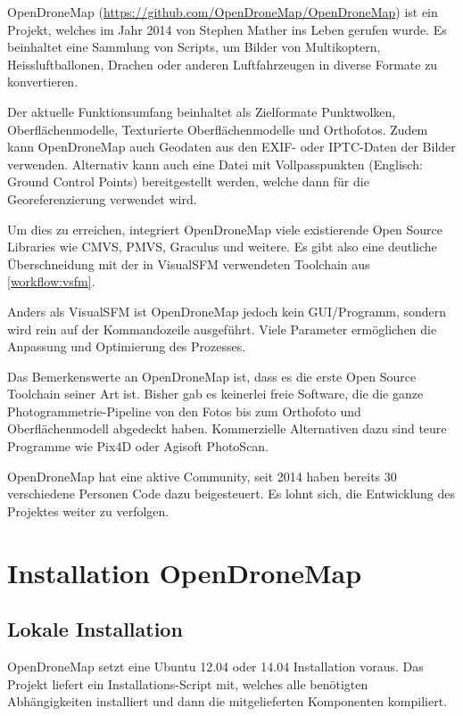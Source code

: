 OpenDroneMap (\url{https://github.com/OpenDroneMap/OpenDroneMap}) ist ein
Projekt, welches im Jahr 2014 von Stephen Mather ins Leben gerufen
wurde\cite{smathermather:2014}. Es beinhaltet eine Sammlung von Scripts, um
Bilder von Multikoptern, Heissluftballonen, Drachen oder anderen Luftfahrzeugen
in diverse Formate zu konvertieren.

Der aktuelle Funktionsumfang beinhaltet als Zielformate Punktwolken,
Oberflächenmodelle, Texturierte Oberflächenmodelle und Orthofotos. Zudem kann
OpenDroneMap auch Geodaten aus den EXIF- oder IPTC-Daten der Bilder verwenden.
Alternativ kann auch eine Datei mit Vollpasspunkten (Englisch: Ground Control
Points) bereitgestellt werden, welche dann für die Georeferenzierung verwendet
wird.

Um dies zu erreichen, integriert OpenDroneMap viele existierende Open Source
Libraries wie CMVS, PMVS, Graculus und weitere. Es gibt also eine deutliche
Überschneidung mit der in VisualSFM verwendeten Toolchain aus
\autoref{workflow:vsfm}.

Anders als VisualSFM ist OpenDroneMap jedoch kein GUI\-/Programm, sondern wird
rein auf der Kommandozeile ausgeführt. Viele Parameter ermöglichen die Anpassung
und Optimierung des Prozesses.

Das Bemerkenswerte an OpenDroneMap ist, dass es die erste Open Source Toolchain
seiner Art ist. Bisher gab es keinerlei freie Software, die die ganze
Photogrammetrie-Pipeline von den Fotos bis zum Orthofoto und Oberflächenmodell
abgedeckt haben. Kommerzielle Alternativen dazu sind teure Programme wie Pix4D
oder Agisoft PhotoScan.

OpenDroneMap hat eine aktive Community, seit 2014 haben bereits 30 verschiedene
Personen Code dazu beigesteuert. Es lohnt sich, die Entwicklung des Projektes
weiter zu verfolgen.


\section{Installation OpenDroneMap}

\subsection{Lokale Installation}

OpenDroneMap setzt eine Ubuntu 12.04 oder 14.04 Installation voraus. Das
Projekt liefert ein Installations-Script mit, welches alle benötigten
Abhängigkeiten installiert und dann die mitgelieferten Komponenten kompiliert.

